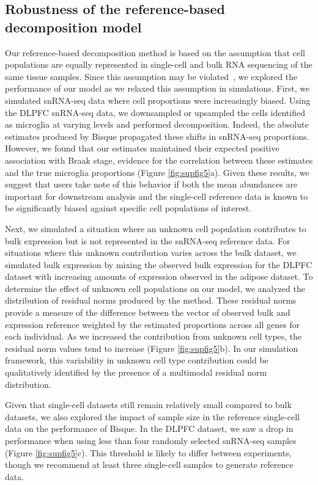 \subsection{Robustness of the reference-based decomposition model}

Our reference-based decomposition method is based on the assumption that cell populations are equally represented in single-cell and bulk RNA sequencing of the same tissue samples. Since this assumption may be violated~\cite{Schelker2017-ms}, we explored the performance of our model as we relaxed this assumption in simulations. First, we simulated snRNA-seq data where cell proportions were increasingly biased. Using the DLPFC snRNA-seq data, we downsampled or upsampled the cells identified as microglia at varying levels and performed decomposition. Indeed, the absolute estimates produced by Bisque propagated these shifts in snRNA-seq proportions. However, we found that our estimates maintained their expected positive association with Braak stage, evidence for the correlation between these estimates and the true microglia proportions (Figure \ref{fig:supfig5}a).  Given these results, we suggest that users take note of this behavior if both the mean abundances are important for downstream analysis and the single-cell reference data is known to be significantly biased against specific cell populations of interest.
 
Next, we simulated a situation where an unknown cell population contributes to bulk expression but is not represented in the snRNA-seq reference data. For situations where this unknown contribution varies across the bulk dataset, we simulated bulk expression by mixing the observed bulk expression for the DLPFC dataset with increasing amounts of expression observed in the adipose dataset. To determine the effect of unknown cell populations on our model, we analyzed the distribution of residual norms produced by the method. These residual norms provide a measure of the difference between the vector of observed bulk and expression reference weighted by the estimated proportions across all genes for each individual. As we increased the contribution from unknown cell types, the residual norm values tend to increase (Figure \ref{fig:supfig5}b). In our simulation framework, this variability in unknown cell type contribution could be qualitatively identified by the presence of a multimodal residual norm distribution. 

Given that single-cell datasets still remain relatively small compared to bulk datasets, we also explored the impact of sample size in the reference single-cell data on the performance of Bisque. In the DLPFC dataset, we saw a drop in performance when using less than four randomly selected snRNA-seq samples (Figure \ref{fig:supfig5}c). This threshold is likely to differ between experiments, though we recommend at least three single-cell samples to generate reference data. 

